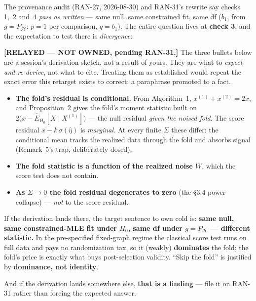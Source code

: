 \documentclass[11pt,a4paper]{article}
\newcommand{\Hh}{\mathcal{H}}
\newcommand{\Pharm}{P_{\Hh}}
\theoremstyle{definition}
\begin{document}
The provenance audit (RAN-27, 2026-08-30) and RAN-31's rewrite say checks 1,~2
and~4 \emph{pass as written} --- same null, same constrained fit, same df ($b_1$,
from $g=\Pharm$: $p=1$ per comparison, $q=b_1$). The entire question lives at
\textbf{check 3}, and the expectation to test there is \emph{divergence}:

\begin{mdframed}[style=callout]
\noindent\textbf{[RELAYED --- NOT OWNED, pending RAN-31.]} The three bullets
below are a session's derivation sketch, not a result of yours. They are what to
\emph{expect and re-derive}, not what to cite. Treating them as established would
repeat the exact error this retarget exists to correct: a paraphrase promoted to
a fact.

\begin{itemize}[leftmargin=1.4em,itemsep=0.35em,topsep=0.5em]
\item \textbf{The fold's residual is conditional.} From Algorithm~1,
  $x^{(1)}+x^{(2)}=2x$, and Proposition~2 gives the fold's moment statistic built
  on $2\bigl(x-\hat{E}_{H_0}[X\mid X^{(1)}]\bigr)$ --- the null residual
  \emph{given the noised fold}. The score residual $x-k\,\sigma(\hat\eta)$ is
  \emph{marginal}. At every finite $\Sigma$ these differ: the conditional mean
  tracks the realized data through the fold and absorbs signal (Remark~5's trap,
  deliberately dosed).
\item \textbf{The fold statistic is a function of the realized noise $W$},
  which the score test does not contain.
\item \textbf{As $\Sigma\to0$ the fold residual degenerates to zero} (the \S3.4
  power collapse) --- \emph{not} to the score residual.
\end{itemize}
\end{mdframed}

\begin{sloppypar}
If the derivation lands there, the target sentence to own cold is: \textbf{same
null, same constrained-MLE fit under $H_0$, same df under $g=\Pharm$ ---
different statistic.} In the pre-specified fixed-graph regime the classical score
test runs on full data and pays no randomization tax, so it (weakly)
\textbf{dominates} the fold; the fold's price is exactly what buys post-selection
validity. ``Skip the fold'' is justified by \textbf{dominance, not identity}.
\end{sloppypar}

\smallskip
\noindent And if the derivation lands somewhere else, \textbf{that is a finding}
--- file it on RAN-31 rather than forcing the expected answer.
\end{document}

